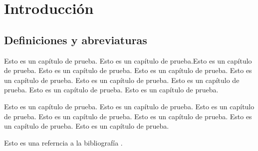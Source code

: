 \chapter{Introducción}\label{introduccion}
\section{Definiciones y abreviaturas}\label{definicionesyabreviaturas}

Esto es un cap\'itulo de prueba. Esto es un cap\'itulo de prueba.Esto es un cap\'itulo de prueba.
Esto es un cap\'itulo de prueba. Esto es un cap\'itulo de prueba. Esto es un cap\'itulo de prueba. 
Esto es un cap\'itulo de prueba. Esto es un cap\'itulo de prueba. Esto es un cap\'itulo de prueba. 
Esto es un cap\'itulo de prueba. 

Esto es un cap\'itulo de prueba. Esto es un cap\'itulo de prueba. Esto es un cap\'itulo de prueba. 
Esto es un cap\'itulo de prueba. Esto es un cap\'itulo de prueba. Esto es un cap\'itulo de prueba. 
Esto es un cap\'itulo de prueba. 

Esto es una referncia a la bibliograf\'ia \cite{desousa}.




